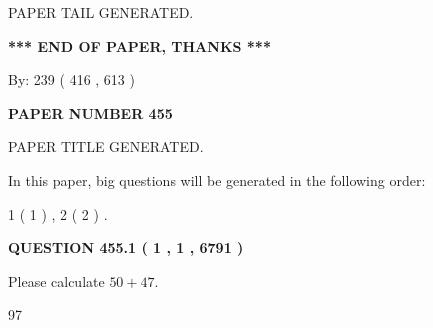 \documentclass[12pt]{article}
\begin{document}
   
   
   
   
   
 \vspace{0.2in}
 
   
   
\vspace{2.0in} PAPER TAIL GENERATED.
   
   
   
   
\vspace{1.0in} 
{\textbf{\large{ *** END OF PAPER, THANKS *** }}} 
   
   
\hspace{1.0in} By: 
 239 ( 416 ,  613 )
   
   
   
   
\newpage 
\setcounter{page}{ 
   455001 } 
   
   
   
   
 {\textbf{ \Large{ PAPER NUMBER  455  }}}
   
   
\vspace{0.2in}
   
   
   
   
   
   
   
   
 \vspace{0.2in}
 
 
 
 
   
   
 PAPER TITLE GENERATED.
   
   
   
\vspace{0.2in}
   
In this paper, big questions will be generated in the following order: 
   
   
   1 ( 1 )
 ,
   2 ( 2 )
 .
  
\vspace{0.2in}
  
{\textbf{\Large{QUESTION
455.1 
 ( 1 , 1 , 6791 )
}}}
  
  
 
Please calculate $ %
50 +  %
47 $.
 
 
 
\noindent{}
 
 

97
 
 
\noindent{}
 
\end{document}
